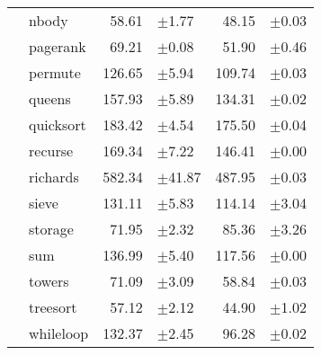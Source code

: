 \begin{tabular}{llrlrl}
 & nbody & 58.61 & \scriptsize\textcolor{gray!60}{$\pm$1.77} & 48.15 & \scriptsize\textcolor{gray!60}{$\pm$0.03} \\
 & pagerank & 69.21 & \scriptsize\textcolor{gray!60}{$\pm$0.08} & 51.90 & \scriptsize\textcolor{gray!60}{$\pm$0.46} \\
 & permute & 126.65 & \scriptsize\textcolor{gray!60}{$\pm$5.94} & 109.74 & \scriptsize\textcolor{gray!60}{$\pm$0.03} \\
 & queens & 157.93 & \scriptsize\textcolor{gray!60}{$\pm$5.89} & 134.31 & \scriptsize\textcolor{gray!60}{$\pm$0.02} \\
 & quicksort & 183.42 & \scriptsize\textcolor{gray!60}{$\pm$4.54} & 175.50 & \scriptsize\textcolor{gray!60}{$\pm$0.04} \\
 & recurse & 169.34 & \scriptsize\textcolor{gray!60}{$\pm$7.22} & 146.41 & \scriptsize\textcolor{gray!60}{$\pm$0.00} \\
 & richards & 582.34 & \scriptsize\textcolor{gray!60}{$\pm$41.87} & 487.95 & \scriptsize\textcolor{gray!60}{$\pm$0.03} \\
 & sieve & 131.11 & \scriptsize\textcolor{gray!60}{$\pm$5.83} & 114.14 & \scriptsize\textcolor{gray!60}{$\pm$3.04} \\
 & storage & 71.95 & \scriptsize\textcolor{gray!60}{$\pm$2.32} & 85.36 & \scriptsize\textcolor{gray!60}{$\pm$3.26} \\
 & sum & 136.99 & \scriptsize\textcolor{gray!60}{$\pm$5.40} & 117.56 & \scriptsize\textcolor{gray!60}{$\pm$0.00} \\
 & towers & 71.09 & \scriptsize\textcolor{gray!60}{$\pm$3.09} & 58.84 & \scriptsize\textcolor{gray!60}{$\pm$0.03} \\
 & treesort & 57.12 & \scriptsize\textcolor{gray!60}{$\pm$2.12} & 44.90 & \scriptsize\textcolor{gray!60}{$\pm$1.02} \\
 & whileloop & 132.37 & \scriptsize\textcolor{gray!60}{$\pm$2.45} & 96.28 & \scriptsize\textcolor{gray!60}{$\pm$0.02} \\
\bottomrule
\end{tabular}
